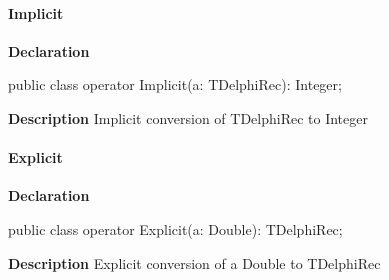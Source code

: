 \documentclass{report}
\newif\ifpdf
\begin{document}
\paragraph*{Implicit}\hspace*{\fill}

\label{ok_operator_test.TDelphiRec-Implicit}
\begin{list}{}{
\setlength{\itemindent}{0cm}
\setlength{\listparindent}{0cm}
\setlength{\leftmargin}{\evensidemargin}
\addtolength{\leftmargin}{\tmplength}
\settowidth{\labelsep}{X}
\addtolength{\leftmargin}{\labelsep}
\setlength{\labelwidth}{\tmplength}
}
\item[\textbf{Declaration}\hfill]
\ifpdf
\begin{flushleft}
\fi
\begin{ttfamily}
public class operator Implicit(a: TDelphiRec): Integer;\end{ttfamily}

\ifpdf
\end{flushleft}
\fi

\par
\item[\textbf{Description}]
Implicit conversion of TDelphiRec to Integer

\end{list}
\paragraph*{Explicit}\hspace*{\fill}

\label{ok_operator_test.TDelphiRec-Explicit}
\begin{list}{}{
\setlength{\itemindent}{0cm}
\setlength{\listparindent}{0cm}
\setlength{\leftmargin}{\evensidemargin}
\addtolength{\leftmargin}{\tmplength}
\settowidth{\labelsep}{X}
\addtolength{\leftmargin}{\labelsep}
\setlength{\labelwidth}{\tmplength}
}
\item[\textbf{Declaration}\hfill]
\ifpdf
\begin{flushleft}
\fi
\begin{ttfamily}
public class operator Explicit(a: Double): TDelphiRec;\end{ttfamily}

\ifpdf
\end{flushleft}
\fi

\par
\item[\textbf{Description}]
Explicit conversion of a Double to TDelphiRec

\end{list}
\ifpdf
\end{document}
